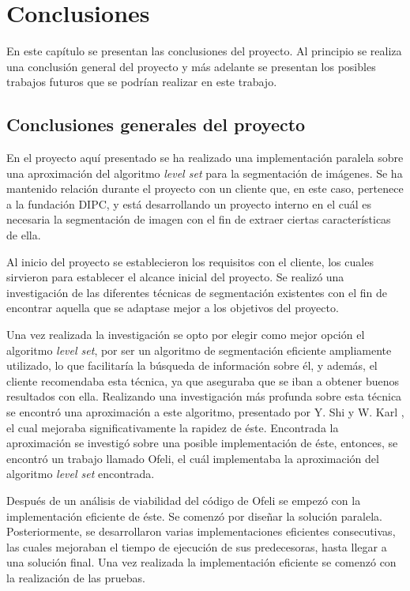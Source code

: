 \chapter{Conclusiones}

En este cap\'{i}tulo se presentan las conclusiones del proyecto. Al principio se realiza una conclusi\'{o}n general del proyecto y m\'{a}s adelante se presentan los posibles trabajos futuros que se podr\'{i}an realizar en este trabajo.

\section{Conclusiones generales del proyecto}

En el proyecto aqu\'{i} presentado se ha realizado una implementaci\'{o}n paralela sobre una aproximaci\'{o}n del algoritmo \textit{level set} para la segmentaci\'{o}n de im\'{a}genes. Se ha mantenido relaci\'{o}n durante el proyecto con un cliente que, en este caso, pertenece a la fundaci\'{o}n DIPC, y est\'{a} desarrollando un proyecto interno en el cu\'{a}l es necesaria la segmentaci\'{o}n de imagen con el fin de extraer ciertas caracter\'{i}sticas de ella. 

Al inicio del proyecto se establecieron los requisitos con el cliente, los cuales sirvieron para establecer el alcance inicial del proyecto. Se realiz\'{o} una investigaci\'{o}n de las diferentes t\'{e}cnicas de segmentaci\'{o}n existentes con el fin de encontrar aquella que se adaptase mejor a los objetivos del proyecto. 

Una vez realizada la investigaci\'{o}n se opto por elegir como mejor opci\'{o}n el algoritmo \textit{level set}, por ser un algoritmo de segmentaci\'{o}n eficiente ampliamente utilizado, lo que facilitar\'{i}a la b\'{u}squeda de informaci\'{o}n sobre \'{e}l, y adem\'{a}s, el cliente recomendaba esta t\'{e}cnica, ya que aseguraba que se iban a obtener buenos resultados con ella. Realizando una investigaci\'{o}n m\'{a}s profunda sobre esta t\'{e}cnica se encontr\'{o} una aproximaci\'{o}n a este algoritmo, presentado por Y. Shi y W. Karl \cite{yong1}, el cual mejoraba significativamente la rapidez de \'{e}ste. Encontrada la aproximaci\'{o}n se investig\'{o} sobre una posible implementaci\'{o}n de \'{e}ste, entonces, se encontr\'{o} un trabajo llamado Ofeli, el cu\'{a}l implementaba la aproximaci\'{o}n del algoritmo \textit{level set} encontrada.

Despu\'{e}s de un an\'{a}lisis de viabilidad del c\'{o}digo de Ofeli se empez\'{o} con la implementaci\'{o}n eficiente de \'{e}ste. Se comenz\'{o} por dise\~{n}ar la soluci\'{o}n paralela. Posteriormente, se desarrollaron varias implementaciones eficientes consecutivas, las cuales mejoraban el tiempo de ejecuci\'{o}n de sus predecesoras, hasta llegar a una soluci\'{o}n final. Una vez realizada la implementaci\'{o}n eficiente se comenz\'{o} con la realizaci\'{o}n de las pruebas.

